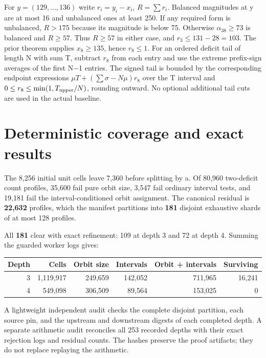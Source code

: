 \documentclass[11pt,letterpaper]{article}
\begin{document}
For \(y=(129,\dots,136)\) write \(r_i=y_i-x_i\), \(R=\sum r_i\).
Balanced magnitudes at y are at most 16 and unbalanced ones at least
250. If any required form is unbalanced, \(R>175\) because its magnitude
is below 75. Otherwise \(\alpha_{38}\ge73\) is balanced and \(R\ge57\).
Thus \(R\ge57\) in either case, and \(r_3\le131-28=103\). The prior
theorem supplies \(x_8\ge135\), hence \textbf{\(r_8\le1\)}. For an
ordered deficit tail of length N with sum T, subtract \(r_8\) from each
entry and use the extreme prefix-sign averages of the first N−1 entries.
The signed tail is bounded by the corresponding endpoint expressions
\(\mu T+(\sum\sigma-N\mu)r_8\) over the T interval and
\(0\le r_8\le\min(1,T_{\rm upper}/N)\), rounding outward. No optional
additional tail cuts are used in the actual baseline.

\section{Deterministic coverage and exact
results}\label{deterministic-coverage-and-exact-results}

The 8,256 initial unit cells leave 7,360 before splitting by a. Of
80,960 two-deficit count profiles, 35,600 fail pure orbit size, 3,547
fail ordinary interval tests, and 19,181 fail the interval-conditioned
orbit assignment. The canonical residual is \textbf{22,632} profiles,
which the manifest partitions into \textbf{181} disjoint exhaustive
shards of at most 128 profiles.

All \textbf{181} clear with exact refinement: 109 at depth 3 and 72 at
depth 4. Summing the guarded worker logs gives:

\begin{center}
\small
\begin{tabular}{rrrrrr}
\toprule
Depth & Cells & Orbit size & Intervals & Orbit + intervals & Surviving \\
\midrule
3 & 1,119,917 & 249,659 & 142,052 & 711,965 & 16,241 \\
4 & 549,098 & 306,509 & 89,564 & 153,025 & 0 \\
\bottomrule
\end{tabular}
\end{center}

A lightweight independent audit checks the complete disjoint partition,
each source pin, and the upstream and downstream digests of each
completed depth. A separate arithmetic audit reconciles all 253 recorded
depths with their exact rejection logs and residual counts. The hashes
preserve the proof artifacts; they do not replace replaying the
arithmetic.
\end{document}
